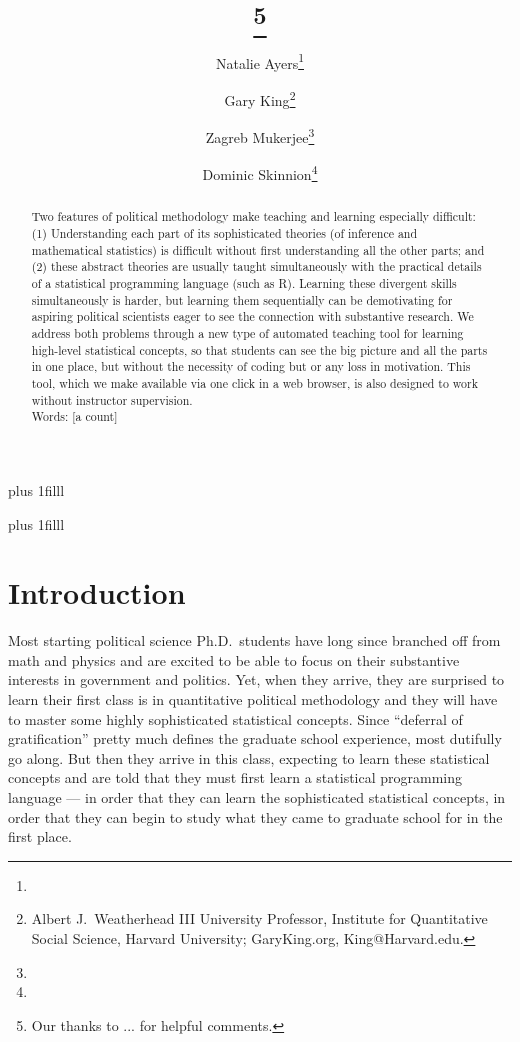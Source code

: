 \documentclass[12pt]{article}
\title{\titl}
\title{\titl\thanks{Our thanks to ... for helpful comments.}}
\author{Natalie Ayers\thanks{}\and Gary King\thanks{Albert J.\ Weatherhead
III University Professor, Institute for Quantitative Social
Science, Harvard University; GaryKing.org, King@Harvard.edu.}\and Zagreb Mukerjee\thanks{} \and Dominic Skinnion\thanks{}}
\newcommand{\btVFill}{\vskip0pt plus 1filll}
\theoremstyle{definition}
\begin{document}
\maketitle\thispagestyle{empty}\setcounter{page}{0}
\btVFill
\vspace{-2\baselineskip}
\begin{abstract}
  \noindent Two features of political methodology make teaching and learning especially difficult: (1) Understanding each part of its sophisticated theories (of inference and mathematical statistics) is difficult without first understanding all the other parts; and (2) these abstract theories are usually taught simultaneously with the practical details of a statistical programming language (such as R).  Learning these divergent skills simultaneously is harder, but learning them sequentially can be demotivating for aspiring political scientists eager to see the connection with substantive research.  We address both problems through a new type of automated teaching tool for learning high-level statistical concepts, so that students can see the big picture and all the parts in one place, but without the necessity of coding but or any loss in motivation. This tool, which we make available via one click in a web browser, is also designed to work without instructor supervision.
  \\
  \newline
\noindent Words: [a count] 
\end{abstract}
\btVFill
\clearpage
{}\baselineskip

\section{Introduction}\label{s:intro}

Most starting political science Ph.D.\ students have long since branched off from math and physics and are excited to be able to focus on their substantive interests in government and politics. Yet, when they arrive, they are surprised to learn their first class is in quantitative political methodology and they will have to master some highly sophisticated statistical concepts. Since ``deferral of gratification'' pretty much defines the graduate school experience, most dutifully go along. But then they arrive in this class, expecting to learn these statistical concepts and are told that they must first  learn a statistical programming language --- in order that they can learn the sophisticated statistical concepts, in order that they can begin to study what they came to graduate school for in the first place.
\end{document}
